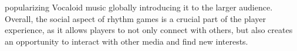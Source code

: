 popularizing Vocaloid music globally introducing it to the larger audience. Overall, the social aspect of rhythm games is a crucial part of the player experience, as it allows players to not only connect with others, but also creates an opportunity to interact with other media and find new interests.